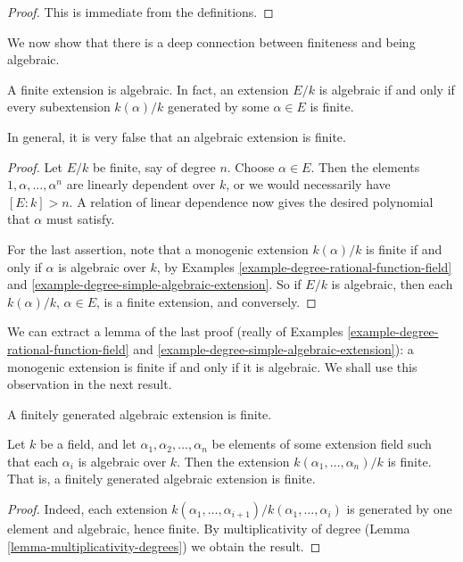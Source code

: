 \begin{proof}
This is immediate from the definitions.
\end{proof}

\noindent
We now show that there is a deep connection between finiteness and being
algebraic.

\begin{lemma}
\label{lemma-finite-is-algebraic}
A finite extension is algebraic. In fact, an extension $E/k$ is algebraic
if and only if every subextension $k(\alpha)/k$ generated by some
$\alpha \in E$ is finite.
\end{lemma}

\noindent
In general, it is very false that an algebraic extension is finite.

\begin{proof}
Let $E/k$ be finite, say of degree $n$. Choose $\alpha \in E$. Then the
elements $1, \alpha, \ldots, \alpha^n$ are linearly
dependent over $k$, or we would necessarily have $[E : k] > n$. A relation of
linear dependence now gives the desired polynomial that $\alpha$ must satisfy.

\medskip\noindent
For the last assertion, note that a monogenic extension $k(\alpha)/k$ is
finite if and only if $\alpha$ is algebraic over $k$, by
Examples \ref{example-degree-rational-function-field} and
\ref{example-degree-simple-algebraic-extension}.
So if $E/k$ is algebraic, then each $k(\alpha)/k$, $\alpha \in E$, is a finite
extension, and conversely.
\end{proof}

\noindent
We can extract a lemma of the last proof (really of
Examples \ref{example-degree-rational-function-field} and
\ref{example-degree-simple-algebraic-extension}):
a monogenic extension is finite if and only if it is algebraic.
We shall use this observation in the next result.

\begin{lemma}
\label{lemma-algebraic-finitely-generated}
\begin{slogan}
A finitely generated algebraic extension is finite.
\end{slogan}
Let $k$ be a field, and let $\alpha_1, \alpha_2, \ldots, \alpha_n$ be elements
of some extension field such that each $\alpha_i$ is algebraic over $k$. Then
the extension $k(\alpha_1, \ldots, \alpha_n)/k$ is finite.
That is, a finitely generated algebraic extension is finite.
\end{lemma}

\begin{proof}
Indeed, each extension
$k(\alpha_{1}, \ldots, \alpha_{i+1})/k(\alpha_1, \ldots, \alpha_{i})$
is generated by one element and algebraic, hence finite.
By multiplicativity of degree (Lemma \ref{lemma-multiplicativity-degrees})
we obtain the result.
\end{proof}

